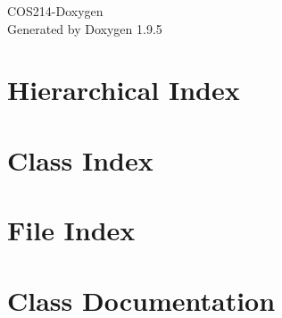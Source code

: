 \documentclass[twoside]{book}
\newcommand{\+}{\discretionary{\mbox{\scriptsize$\hookleftarrow$}}{}{}}
\newcommand{\clearemptydoublepage}{%
    \newpage{\pagestyle{empty}\cleardoublepage}%
  }
\begin{document}
  \raggedbottom
    \hypersetup{pageanchor=false,
                bookmarksnumbered=true,
                pdfencoding=unicode
               }
  \begin{titlepage}
  \vspace*{7cm}
  \begin{center}%
  {\Large COS214-\/\+Doxygen}\\
  \vspace*{1cm}
  {\large Generated by Doxygen 1.9.5}\\
  \end{center}
  \end{titlepage}
  \clearemptydoublepage
  \tableofcontents
  \clearemptydoublepage
  \hypersetup{pageanchor=true}
\chapter{Hierarchical Index}

\chapter{Class Index}

\chapter{File Index}

\chapter{Class Documentation}

















































\end{document}
